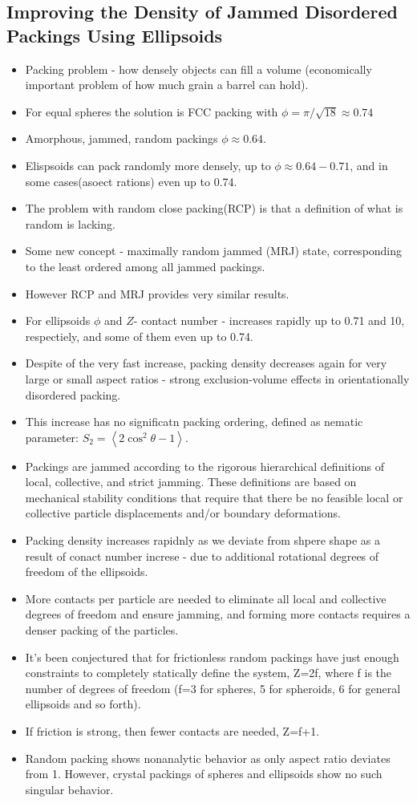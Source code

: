 \documentclass[10pt,a4paper]{article}
\begin{document}
\subsection{Improving the Density of Jammed Disordered Packings Using Ellipsoids\cite{don:04}}
\begin{itemize}
 \item Packing problem - how densely objects can fill a volume (economically important problem of how much grain a barrel can hold).
 \item For equal spheres the solution is FCC packing with $\phi = \pi/\sqrt{18} \approx 0.74$
 \item Amorphous, jammed, random packings $\phi \approx 0.64$.
 \item Elispsoids can pack randomly more densely, up to $\phi \approx 0.64-0.71$, and in some cases(asoect rations) even up to 0.74.
 \item The problem with random close packing(RCP) is that a definition of what is random is lacking. 
 \item Some new concept - maximally random jammed (MRJ) state, corresponding to the least ordered among all jammed packings.
 \item However RCP and MRJ provides very similar results.
 \item For ellipsoids $\phi$ and $Z$- contact number - increases rapidly up to 0.71 and 10, respectiely, and some of them even up to 0.74.
 \item Despite of the very fast increase, packing density decreases again for very large or small aspect ratios - strong exclusion-volume 
 effects in orientationally disordered packing.
 \item This increase has no significatn packing ordering, defined as nematic parameter: $S_2 = \left< 2\cos^2 \theta - 1 \right>$.
 \item Packings are jammed according to the rigorous hierarchical definitions of local, collective, and strict jamming.
 These definitions are based on mechanical stability conditions that require that there be no feasible local or 
 collective particle displacements and/or boundary deformations.
 \item Packing density increases rapidnly as we deviate from shpere shape as a result of conact number increse - 
 due to additional rotational degrees of freedom of the ellipsoids.
 \item More contacts per particle are needed to eliminate all local and collective degrees of freedom and ensure jamming,
 and forming more contacts requires a denser packing of the particles.
 \item It's been conjectured that for frictionless random packings have just enough constraints to completely statically define the system, Z=2f,
 where f is the number of degrees of freedom (f=3 for spheres, 5 for spheroids, 6 for general ellipsoids and so forth).
 \item If friction is strong, then fewer contacts are needed, Z=f+1.
 \item Random packing shows  nonanalytic behavior as only aspect ratio deviates from 1. 
 However, crystal packings of spheres and ellipsoids show no such singular behavior.
\end{itemize}
 
\end{document}
